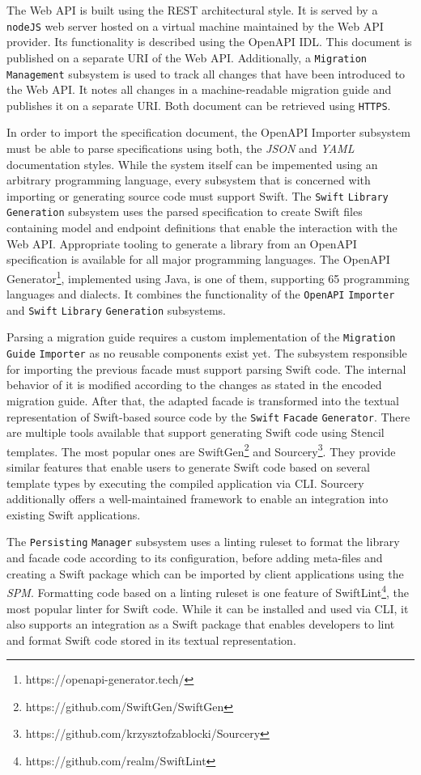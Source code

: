The Web API is built using the \ac{REST} architectural style. It is served by a \texttt{nodeJS} web server hosted on a virtual machine maintained by the Web API provider. Its functionality is described using the OpenAPI \ac{IDL}. This document is published on a separate URI of the Web API. Additionally, a \texttt{Migration Management} subsystem is used to track all changes that have been introduced to the Web API. It notes all changes in a machine-readable migration guide and publishes it on a separate URI. Both document can be retrieved using \texttt{HTTPS}. 

In order to import the specification document, the OpenAPI Importer subsystem must be able to parse specifications using both, the \textit{\ac{JSON}} and \textit{\ac{YAML}} documentation styles. While the system itself can be impemented using an arbitrary programming language, every subsystem that is concerned with importing or generating source code must support Swift. The \texttt{Swift} \texttt{Library} \texttt{Gen\-er\-ation} subsystem uses the parsed specification to create Swift files containing model and endpoint definitions that enable the interaction with the Web API. Appropriate tooling to generate a library from an OpenAPI specification is available for all major programming languages. The OpenAPI Generator\footnote{https://openapi-generator.tech/}, implemented using Java, is one of them, supporting 65 programming languages and dialects. It combines the functionality of the \texttt{OpenAPI} \texttt{Importer} and \texttt{Swift} \texttt{Library} \texttt{Gen\-er\-ation} subsystems.

Parsing a migration guide requires a custom implementation of the \texttt{Migration} \texttt{Guide} \texttt{Importer} as no reusable components exist yet. The subsystem responsible for importing the previous facade must support parsing Swift code. The internal behavior of it is modified according to the changes as stated in the encoded migration guide. After that, the adapted facade is transformed into the textual representation of Swift-based source code by the \texttt{Swift} \texttt{Facade} \texttt{Generator}. There are multiple tools available that support generating Swift code using Stencil templates. The most popular ones are SwiftGen\footnote{https://github.com/SwiftGen/SwiftGen} and Sourcery\footnote{https://github.com/krzysztofzablocki/Sourcery}. They provide similar features that enable users to generate Swift code based on several template types by executing the compiled application via CLI. Sourcery additionally offers a well-maintained framework to enable an integration into existing Swift applications.

The \texttt{Persisting} \texttt{Manager} subsystem uses a linting ruleset to format the library and facade code according to its configuration, before adding meta-files and creating a Swift package which can be imported by client applications using the \textit{\ac{SPM}}. Formatting code based on a linting ruleset is one feature of SwiftLint\footnote{https://github.com/realm/SwiftLint}, the most popular linter for Swift code. While it can be installed and used via CLI, it also supports an integration as a Swift package that enables developers to lint and format Swift code stored in its textual representation.